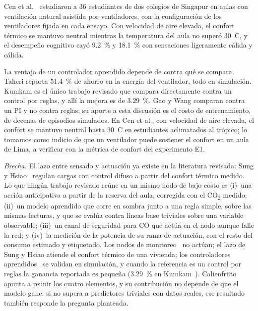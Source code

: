 \documentclass[manuscript,screen,nonacm,natbib=false]{acmart}
\newcommand{\gradC}{\textdegree{}C}
\newcommand{\COdos}{CO\textsubscript{2}}
\begin{document}
Cen et al.~\cite{cen2024students} estudiaron a 36 estudiantes de dos colegios de Singapur en aulas con ventilación natural asistida por ventiladores, con la configuración de los ventiladores fijada en cada ensayo. Con velocidad de aire elevada, el confort térmico se mantuvo neutral mientras la temperatura del aula no superó 30~\gradC{}, y el desempeño cognitivo cayó 9.2~\% y 18.1~\% con sensaciones ligeramente cálida y cálida.

La ventaja de un controlador aprendido depende de contra qué se compara. Taheri reporta 51.4~\% de ahorro en la energía del ventilador, todo en simulación. Kumkam es el único trabajo revisado que compara directamente contra un control por reglas, y allí la mejora es de 3.29~\%. Gao y Wang comparan contra un PI y no contra reglas; su aporte a esta discusión es el costo de entrenamiento, de decenas de episodios simulados. En Cen et al., con velocidad de aire elevada, el confort se mantuvo neutral hasta 30~\gradC{} en estudiantes aclimatados al trópico; lo tomamos como indicio de que un ventilador puede sostener el confort en un aula de Lima, a verificar con la métrica de confort del experimento E1.

\textit{Brecha.} El lazo entre sensado y actuación ya existe en la literatura revisada: Sung y Hsiao~\cite{sung2020thermal} regulan cargas con control difuso a partir del confort térmico medido. Lo que ningún trabajo revisado reúne en un mismo nodo de bajo costo es (i)~una acción anticipativa a partir de la reserva del aula, corregida con el \COdos{} medido; (ii)~un modelo aprendido que corre en sombra junto a una regla simple, sobre las mismas lecturas, y que se evalúa contra líneas base triviales sobre una variable observable; (iii)~un canal de seguridad para CO que actúa en el nodo aunque falle la red; y (iv)~la medición de la potencia de su rama de actuación, con el resto del consumo estimado y etiquetado. Los nodos de monitoreo~\cite{fayos2021ventqsys,mumtaz2021iot} no actúan; el lazo de Sung y Hsiao atiende el confort térmico de una vivienda; los controladores aprendidos~\cite{taheri2021learning,gao2023comparative,kumkam2025comparative} se validan en simulación, y cuando la referencia es un control por reglas la ganancia reportada es pequeña (3.29~\% en Kumkam~\cite{kumkam2025comparative}). Calienfriito apunta a reunir los cuatro elementos, y su contribución no depende de que el modelo gane: si no supera a predictores triviales con datos reales, ese resultado también responde la pregunta planteada.

\FloatBarrier
\end{document}
